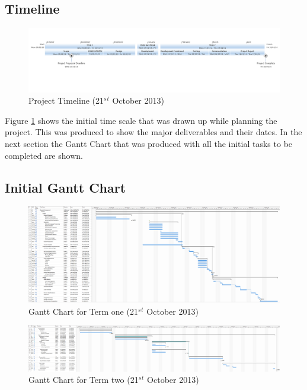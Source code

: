 \begin{landscape}

\subsection{Timeline}

\begin{figure}[H]
  \centering
  \includegraphics[width=\linewidth]{images/timeline1.png}
  \caption{Project Timeline (21$^s$$^t$ October 2013)}
  \label{fig:timeline1}
\end{figure}

Figure \ref{fig:timeline1} shows the initial time scale that was drawn up while
planning the project. This was produced to show the major deliverables and their
dates. In the next section the Gantt Chart that was produced with all the
initial tasks to be completed are shown.

 
\newpage
\subsection{Initial Gantt Chart}

\begin{figure}[H]
  \centering
  \includegraphics[width=\linewidth]{images/gant_chart1_term1.png}
  \caption{Gantt Chart for Term one (21$^s$$^t$ October 2013)}
  \label{fig:ganttinitialterm1}
\end{figure}

\begin{figure}[H]
  \centering
  \includegraphics[width=\linewidth]{images/gant_chart1_term2.png}
  \caption{Gantt Chart for Term two (21$^s$$^t$ October 2013)}
  \label{fig:ganttinitialterm2}
\end{figure}


\end{landscape}
